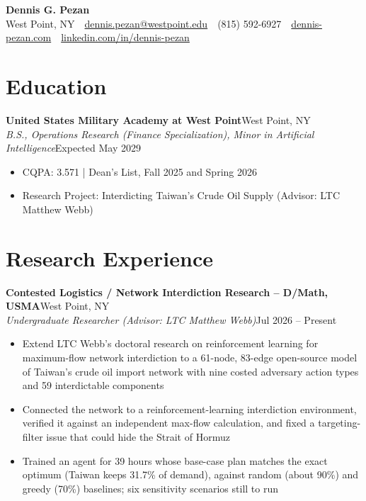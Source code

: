 \documentclass[10pt,letterpaper]{article}
\let\oldsection\section
\renewcommand{\section}{\needspace{7\baselineskip}\oldsection}
\newcommand{\entry}[4]{%
  \needspace{3\baselineskip}%
  \textbf{#1}\hfill #2\\
  \textit{#3}\hfill #4\par}
\begin{document}
\begin{center}
  {\LARGE\bfseries Dennis G. Pezan}\\[2pt]
  West Point, NY \,\textbullet\, \href{mailto:dennis.pezan@westpoint.edu}{dennis.pezan@westpoint.edu} \,\textbullet\, (815) 592-6927 \,\textbullet\, \href{https://dennis-pezan.com}{dennis-pezan.com} \,\textbullet\, \href{https://www.linkedin.com/in/dennis-pezan}{linkedin.com/in/dennis-pezan}
\end{center}
\vspace{-8pt}

\section{Education}
\entry{United States Military Academy at West Point}{West Point, NY}{B.S., Operations Research (Finance Specialization), Minor in Artificial Intelligence}{Expected May 2029}
\begin{itemize}
  \item CQPA: 3.571 \;|\; Dean's List, Fall 2025 and Spring 2026
  \item Research Project: Interdicting Taiwan's Crude Oil Supply (Advisor: LTC Matthew Webb)
\end{itemize}

\section{Research Experience}
\entry{Contested Logistics / Network Interdiction Research -- D/Math, USMA}{West Point, NY}{Undergraduate Researcher (Advisor: LTC Matthew Webb)}{Jul 2026 -- Present}
\begin{itemize}
  \item Extend LTC Webb's doctoral research on reinforcement learning for maximum-flow network interdiction to a 61-node, 83-edge open-source model of Taiwan's crude oil import network with nine costed adversary action types and 59 interdictable components
  \item Connected the network to a reinforcement-learning interdiction environment, verified it against an independent max-flow calculation, and fixed a targeting-filter issue that could hide the Strait of Hormuz
  \item Trained an agent for 39 hours whose base-case plan matches the exact optimum (Taiwan keeps 31.7\% of demand), against random (about 90\%) and greedy (70\%) baselines; six sensitivity scenarios still to run
\end{itemize}
\end{document}
